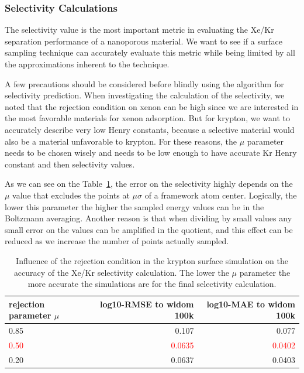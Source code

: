 \documentclass[main]{subfiles}
\begin{document}
\subsubsection{Selectivity Calculations}

The selectivity value is the most important metric in evaluating the Xe/Kr separation performance of a nanoporous material. We want to see if a surface sampling technique can accurately evaluate this metric while being limited by all the approximations inherent to the technique.

A few precautions should be considered before blindly using the algorithm for selectivity prediction. When investigating the calculation of the selectivity, we noted that the rejection condition on xenon can be high since we are interested in the most favorable materials for xenon adsorption. But for krypton, we want to accurately describe very low Henry constants, because a selective material would also be a material unfavorable to krypton. For these reasons, the $\mu$ parameter needs to be chosen wisely and needs to be low enough to have accurate Kr Henry constant and then selectivity values. 

As we can see on the Table~\ref{tab:selec_prob}, the error on the selectivity highly depends on the $\mu$ value that excludes the points at $\mu\sigma$ of a framework atom center. Logically, the lower this parameter the higher the sampled energy values can be in the Boltzmann averaging. Another reason is that when dividing by small values any small error on the values can be amplified in the quotient, and this effect can be reduced as we increase the number of points actually sampled. 

\begin{table}[ht]
  \centering
  \begin{tabular}{|l|r|r|}
  \hline
    rejection parameter $\mu$ &  log10-RMSE to widom 100k &   log10-MAE to widom 100k \\
  \hline
      0.85 &      0.107 &   0.077 \\
      \textcolor{red}{0.50} &      \textcolor{red}{0.0635} &   \textcolor{red}{0.0402} \\
      0.20 &      0.0637 &   0.0403 \\
  \hline
  \end{tabular}
  \caption{Influence of the rejection condition in the krypton surface simulation on the accuracy of the Xe/Kr selectivity calculation. The lower the $\mu$ parameter the more accurate the simulations are for the final selectivity calculation.}\label{tab:selec_prob}
\end{table}
\end{document}
